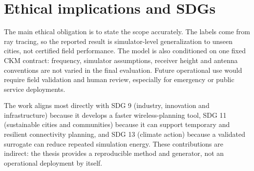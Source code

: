 \section{Ethical implications and SDGs}

The main ethical obligation is to state the scope accurately. The labels come
from ray tracing, so the reported result is simulator-level generalization to
unseen cities, not certified field performance. The model is also conditioned on
one fixed CKM contract: frequency, simulator assumptions, receiver height and
antenna conventions are not varied in the final evaluation. Future operational
use would require field validation and human review, especially for emergency or
public service deployments.

The work aligns most directly with SDG 9 (industry, innovation and
infrastructure) because it develops a faster wireless-planning tool, SDG 11
(sustainable cities and communities) because it can support temporary and
resilient connectivity planning, and SDG 13 (climate action) because a validated
surrogate can reduce repeated simulation energy. These contributions are
indirect: the thesis provides a reproducible method and generator, not an
operational deployment by itself.
